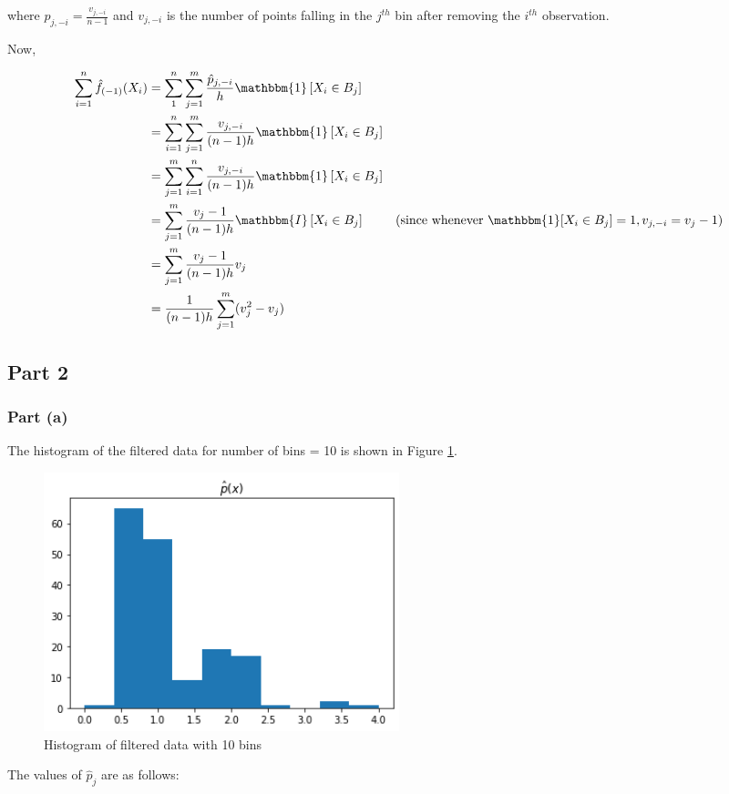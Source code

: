 where $\hat{p}_{j, -i} = \frac{v_{j, -i}}{n-1}$ and $v_{j, -i}$ is the number of points falling in the $j^{th}$ bin after removing the $i^{th}$ observation.

Now, 

\begin{align*}
    \sum_{i=1}^n \hat{f}_{(-1)}(X_i) &= \sum_1^n \sum_{j=1}^m \frac{\hat{p}_{j, -i}}{h} \mathbbm{1}\left[X_i \in B_j\right] \\
    &= \sum_{i=1}^n\sum_{j=1}^m \frac{v_{j, -i}}{(n-1)h} \mathbbm{1}\left[X_i \in B_j\right] \\
    &= \sum_{j=1}^m \sum_{i=1}^n \frac{v_{j, -i}}{(n-1)h} \mathbbm{1}\left[X_i \in B_j\right] \\
    &= \sum_{j=1}^m \frac{v_{j}-1}{(n-1)h} \mathbbm{I}\left[X_i \in B_j\right] & (\text{since whenever }\mathbbm{1}[X_i \in B_j] = 1, v_{j, -i} = v_j - 1 ) \\
    &= \sum_{j=1}^m \frac{v_{j} -1}{(n-1)h} v_j \\
    &= \frac{1}{(n-1)h} \sum_{j=1}^m (v_j^2 - v_j)
\end{align*}

\subsection{Part 2}

\subsubsection{Part (a)}

The histogram of the filtered data for number of bins = 10 is shown in Figure \ref{fig:q1_2_a}.

\begin{figure}[H]
    \centering
    \includegraphics[width=0.5\textwidth]{../q1/images/10binhistogram.png}
    \caption{Histogram of filtered data with 10 bins}
    \label{fig:q1_2_a}
\end{figure}

The values of $\hat{p}_j$ are as follows:

